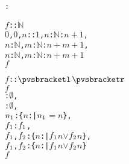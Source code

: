 \def\setsothermembertwofn#1#2{{(#1 \in #2)}}%
\def\opohtwofn#1#2{{#1\circ#2}}%
\def\opdividetwofn#1#2{{\frac{#1}{#2}}}%
\def\optimestwofn#1#2{{#1\times#2}}%
\def\opdifferenceonefn#1{{-#1}}%
\def\opdifferencetwofn#1#2{{#1-#2}}%
\def\opplustwofn#1#2{{#1+#2}}%
\begin{alltt}
: 

   

  \pvsid{(}\(f\): \pvsid{)}: \(\mathbb{N}\) \pvskey{=}
      \pvsid{(}\(0\), \(0\),  \pvsid{(}\(n\): \pvsid{)}: \(1\),  \pvsid{(}\(n\): \(\mathbb{N}\)\pvsid{)}: \(\opplustwofn{n}{1}\),
                   \pvsid{(}\(n\): \(\mathbb{N}\), \(m\): \(\mathbb{N}\)\pvsid{)}: \(\opplustwofn{\opplustwofn{n}{m}}{1}\),
                   \pvsid{(}\(n\): \(\mathbb{N}\), \(m\): \(\mathbb{N}\)\pvsid{)}: \(\opplustwofn{\opplustwofn{n}{m}}{1}\)\pvsid{)}
                \pvsid{(}\(f\)\pvsid{)}\vspace*{\pvsdeclspacing}

  \pvsid{(}\(f\): \pvsid{)}:  \({\pvsbracketl}\)\({\pvsbracketr}\) \pvskey{=}
     \(f\) 
      : \({\emptyset}\),
      : \({\emptyset}\),
      \pvsid{(}\(n\sb{1}\)\pvsid{)}: \{\(n\):  | \(n\sb{1}\) \(=\) \(n\)\},
      \pvsid{(}\(f\sb{1}\)\pvsid{)}: \pvsid{(}\(f\sb{1}\)\pvsid{)},
      \pvsid{(}\(f\sb{1}\), \(f\sb{2}\)\pvsid{)}: \{\(n\):  | \pvsid{(}\(f\sb{1}\)\pvsid{)}\pvsid{(}\(n\)\pvsid{)} \(\vee\) \pvsid{(}\(f\sb{2}\)\pvsid{)}\pvsid{(}\(n\)\pvsid{)}\},
      \pvsid{(}\(f\sb{1}\), \(f\sb{2}\)\pvsid{)}: \{\(n\):  | \pvsid{(}\(f\sb{1}\)\pvsid{)}\pvsid{(}\(n\)\pvsid{)} \(\vee\) \pvsid{(}\(f\sb{2}\)\pvsid{)}\pvsid{(}\(n\)\pvsid{)}\}
      \pvsid{(}\(f\)\pvsid{)}\vspace*{\pvsdeclspacing}


\end{alltt}
